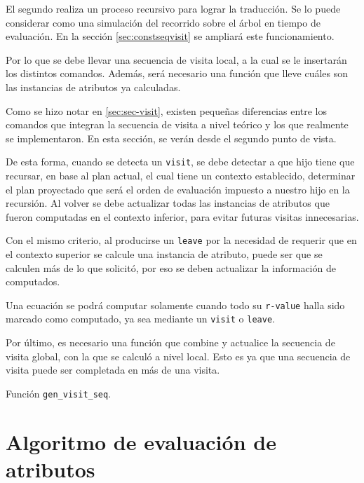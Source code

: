 El segundo realiza un proceso recursivo para lograr la traducción. Se lo puede considerar como una simulación del recorrido sobre el árbol en tiempo de evaluación. En la sección \ref{sec:constseqvisit} se ampliará este funcionamiento.

Por lo que se debe llevar una secuencia de visita local, a la cual se le insertarán los distintos comandos. Además, será necesario una función que lleve cuáles son las instancias de atributos ya calculadas.

Como se hizo notar en \ref{sec:sec-visit}, existen pequeñas diferencias entre los comandos que integran la secuencia de visita a nivel teórico y los que realmente se implementaron. En esta sección, se verán desde el segundo punto de vista.

De esta forma, cuando se detecta un \texttt{visit}, se debe detectar a que hijo tiene que recursar, en base al plan actual, el cual tiene un contexto establecido, determinar el plan proyectado que será el orden de evaluación impuesto a nuestro hijo en la recursión. Al volver se debe actualizar todas las instancias de atributos que fueron computadas en el contexto inferior, para evitar futuras visitas innecesarias.

Con el mismo criterio, al producirse un \texttt{leave} por la necesidad de requerir que en el contexto superior se calcule una instancia de atributo, puede ser que se calculen más de lo que solicitó, por eso se deben actualizar la información de computados.

Una ecuación se podrá computar solamente cuando todo su \texttt{r-value} halla sido marcado como computado, ya sea mediante un \texttt{visit} o \texttt{leave}.

Por último, es necesario una función que combine y actualice la secuencia de visita global, con la que se calculó a nivel local. Esto es ya que una secuencia de visita puede ser completada en más de una visita.

\begin{algorithm}[H]

\caption{Función \texttt{gen\_visit\_seq}.}
\end{algorithm}

\section{Algoritmo de evaluación de atributos}
\label{sec:algevalattr}

